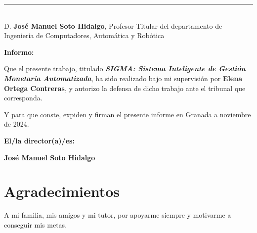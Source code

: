 \noindent\rule[-1ex]{\textwidth}{2pt}\\[4.5ex]

D. \textbf{José Manuel Soto Hidalgo}, Profesor Titular del departamento de Ingeniería de Computadores, Automática y Robótica

\vspace{0.5cm}

\textbf{Informo:}

\vspace{0.5cm}

Que el presente trabajo, titulado \textit{\textbf{SIGMA: Sistema Inteligente de Gestión Monetaria Automatizada}},
ha sido realizado bajo mi supervisión por \textbf{Elena Ortega Contreras}, y autorizo la defensa de dicho trabajo ante el tribunal
que corresponda.

\vspace{0.5cm}

Y para que conste, expiden y firman el presente informe en Granada a noviembre de 2024.

\vspace{1cm}

\textbf{El/la director(a)/es: }

\vspace{5cm}

\noindent \textbf{José Manuel Soto Hidalgo}

\chapter*{Agradecimientos}

A mi familia, mis amigos y mi tutor, por apoyarme siempre y motivarme a conseguir mis metas.

